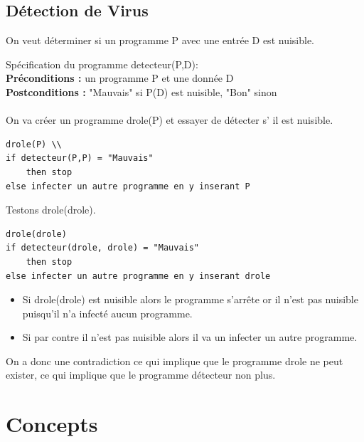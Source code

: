 \documentclass[11pt,a4paper]{article}
\theoremstyle{definition}
\begin{document}

\subsection{Détection de Virus}
\label{sub:d_tection_de_virus}
On veut déterminer si un programme P avec une entrée D est nuisible.

Spécification du programme detecteur(P,D):\\
\textbf{Préconditions :} un programme P et une donnée D\\
\textbf{Postconditions :} "Mauvais" si P(D) est nuisible,
		"Bon" sinon

\paragraph{}On va créer un programme drole(P) et essayer de détecter s’ il est nuisible.

\begin{lstlisting}
drole(P) \\
if detecteur(P,P) = "Mauvais" 
	then stop
else infecter un autre programme en y inserant P
\end{lstlisting}

Testons drole(drole).
\begin{lstlisting}
drole(drole)
if detecteur(drole, drole) = "Mauvais" 
	then stop
else infecter un autre programme en y inserant drole

\end{lstlisting}

\begin{itemize}
	\item Si drole(drole) est nuisible alors le programme s'arrête or il
	       	n'est pas nuisible puisqu'il n'a infecté aucun programme.
	\item Si par contre il n'est pas nuisible alors il va un infecter un 
		autre programme.
\end{itemize}
On a donc une contradiction ce qui implique que le programme drole ne peut 
exister, ce qui implique que  le programme détecteur non plus.


\section{Concepts}
\label{sec:concepts}
\end{document}
